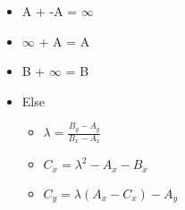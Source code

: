 \begin{itemize}
    \item[] A + -A = $\infty$
    \item[] $\infty$ + A = A
    \item[] B + $\infty$ = B
    \item[] Else
    \begin{itemize}
        \item[] $\lambda = \frac{B_y - A_y} {B_x - A_x}$
        \item[] $C_x = \lambda^2 - A_x - B_x$
        \item[] $C_y = \lambda(A_x - C_x) - A_y$
    \end{itemize}
\end{itemize}

